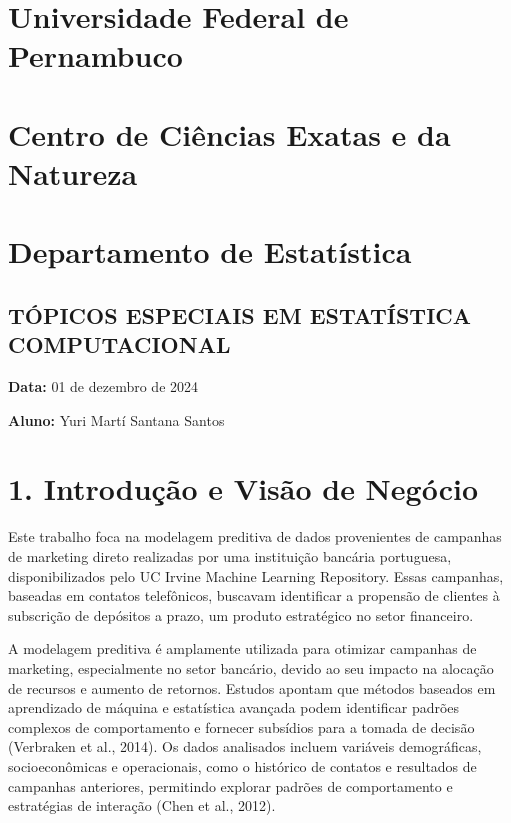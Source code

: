 \documentclass[
  onecolumn]{article}
\author{}
\date{2024-10-31}
\begin{document}
\section{Universidade Federal de
Pernambuco}\label{universidade-federal-de-pernambuco}

\vspace{-.4cm}

\section{Centro de Ciências Exatas e da
Natureza}\label{centro-de-ciuxeancias-exatas-e-da-natureza}

\vspace{-.4cm}

\section{Departamento de
Estatística}\label{departamento-de-estatuxedstica}

\vspace{.5cm}

\subsection{TÓPICOS ESPECIAIS EM ESTATÍSTICA
COMPUTACIONAL}\label{tuxf3picos-especiais-em-estatuxedstica-computacional}

\vspace{.5cm}

\textbf{Data:} 01 de dezembro de 2024

\textbf{Aluno:} Yuri Martí Santana Santos

\vspace{.5cm}

\section{1. Introdução e Visão de
Negócio}\label{introduuxe7uxe3o-e-visuxe3o-de-neguxf3cio}

Este trabalho foca na modelagem preditiva de dados provenientes de
campanhas de marketing direto realizadas por uma instituição bancária
portuguesa, disponibilizados pelo UC Irvine Machine Learning Repository.
Essas campanhas, baseadas em contatos telefônicos, buscavam identificar
a propensão de clientes à subscrição de depósitos a prazo, um produto
estratégico no setor financeiro.

A modelagem preditiva é amplamente utilizada para otimizar campanhas de
marketing, especialmente no setor bancário, devido ao seu impacto na
alocação de recursos e aumento de retornos. Estudos apontam que métodos
baseados em aprendizado de máquina e estatística avançada podem
identificar padrões complexos de comportamento e fornecer subsídios para
a tomada de decisão (Verbraken et al., 2014). Os dados analisados
incluem variáveis demográficas, socioeconômicas e operacionais, como o
histórico de contatos e resultados de campanhas anteriores, permitindo
explorar padrões de comportamento e estratégias de interação (Chen et
al., 2012).
\end{document}
